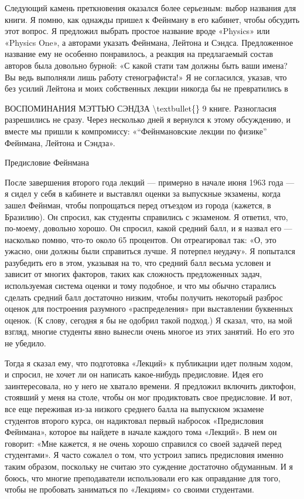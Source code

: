 \documentclass[10pt,oneside]{article}
\begin{document}
Следующий камень преткновения оказался более серьезным: выбор названия для книги. Я помню, как однажды пришел к Фейнману в его кабинет, чтобы обсудить этот вопрос. Я предложил выбрать простое название вроде «Physics» или «Physics One», а авторами указать Фейнмана, Лейтона и Сэндса. Предложенное название ему не особенно понравилось, а реакция на предлагаемый состав авторов была довольно бурной: «С какой стати там должны быть ваши имена? Вы ведь выполняли лишь работу стенографиста!» Я не согласился, указав, что без усилий Лейтона и моих собственных лекции никогда бы не превратились в\par

ВОСПОМИНАНИЯ МЭТТЬЮ СЭНДЗА \textbackslash{}textbullet\{\} 9 книге. Разногласия разрешились не сразу. Через несколько дней я вернулся к этому обсуждению, и вместе мы пришли к компромиссу: «“Фейнмановские лекции по физике” Фейнмана, Лейтона и Сэндза».\par

Предисловие Фейнмана\par

После завершения второго года лекций --- примерно в начале июня 1963 года --- я сидел у себя в кабинете и выставлял оценки за выпускные экзамены, когда зашел Фейнман, чтобы попрощаться перед отъездом из города (кажется, в Бразилию). Он спросил, как студенты справились с экзаменом. Я ответил, что, по-моему, довольно хорошо. Он спросил, какой средний балл, и я назвал его --- насколько помню, что-то около 65 процентов. Он отреагировал так: «О, это ужасно, они должны были справиться лучше. Я потерпел неудачу». Я попытался разубедить его в этом, указывая на то, что средний балл весьма условен и зависит от многих факторов, таких как сложность предложенных задач, используемая система оценки и тому подобное, и что мы обычно старались сделать средний балл достаточно низким, чтобы получить некоторый разброс оценок для построения разумного «распределения» при выставлении буквенных оценок. (К слову, сегодня я бы не одобрил такой подход.) Я сказал, что, на мой взгляд, многие студенты явно вынесли очень многое из этих занятий. Но его это не убедило.\par

Тогда я сказал ему, что подготовка «Лекций» к публикации идет полным ходом, и спросил, не хочет ли он написать какое-нибудь предисловие. Идея его заинтересовала, но у него не хватало времени. Я предложил включить диктофон, стоявший у меня на столе, чтобы он мог продиктовать свое предисловие. И вот, все еще переживая из-за низкого среднего балла на выпускном экзамене студентов второго курса, он надиктовал первый набросок «Предисловия Фейнмана», которое вы найдете в начале каждого тома «Лекций». В нем он говорит: «Мне кажется, я не очень хорошо справился со своей задачей перед студентами». Я часто сожалел о том, что устроил запись предисловия именно таким образом, поскольку не считаю это суждение достаточно обдуманным. И я боюсь, что многие преподаватели использовали его как оправдание для того, чтобы не пробовать заниматься по «Лекциям» со своими студентами.\par
\end{document}
